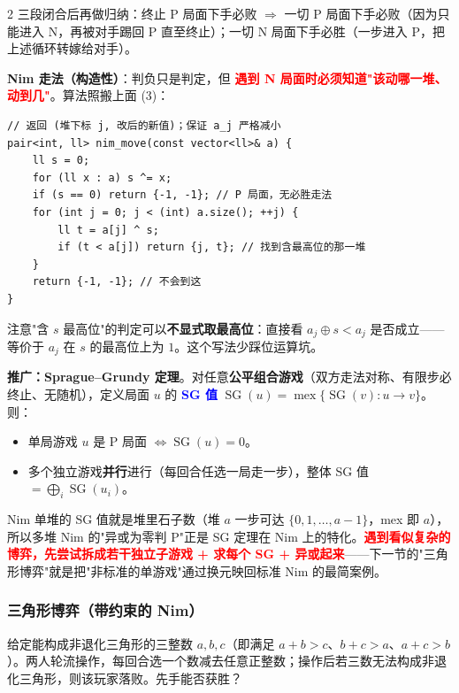 \begin{multicols*}{2}
		三段闭合后再做归纳：终止 P 局面下手必败 $\Rightarrow$ 一切 P 局面下手必败（因为只能进入 N，再被对手踢回 P 直至终止）；一切 N 局面下手必胜（一步进入 P，把上述循环转嫁给对手）。

		\textbf{Nim 走法（构造性）}：判负只是判定，但 \textcolor{red}{\textbf{遇到 N 局面时必须知道"该动哪一堆、动到几"}}。算法照搬上面 (3)：

		\begin{verbatim}
// 返回 (堆下标 j, 改后的新值)；保证 a_j 严格减小
pair<int, ll> nim_move(const vector<ll>& a) {
    ll s = 0;
    for (ll x : a) s ^= x;
    if (s == 0) return {-1, -1}; // P 局面，无必胜走法
    for (int j = 0; j < (int) a.size(); ++j) {
        ll t = a[j] ^ s;
        if (t < a[j]) return {j, t}; // 找到含最高位的那一堆
    }
    return {-1, -1}; // 不会到这
}
		\end{verbatim}

		注意"含 $s$ 最高位"的判定可以\textbf{不显式取最高位}：直接看 $a_j \oplus s < a_j$ 是否成立——等价于 $a_j$ 在 $s$ 的最高位上为 $1$。这个写法少踩位运算坑。

		\textbf{推广：Sprague–Grundy 定理}。对任意\textbf{公平组合游戏}（双方走法对称、有限步必终止、无随机），定义局面 $u$ 的 \textcolor{blue}{\textbf{SG 值}} $\operatorname{SG}(u) = \operatorname{mex}\{\operatorname{SG}(v) : u \to v\}$。则：

		\begin{itemize}
			\item 单局游戏 $u$ 是 P 局面 $\iff \operatorname{SG}(u) = 0$。
			\item 多个独立游戏\textbf{并行}进行（每回合任选一局走一步），整体 SG 值 $= \bigoplus_i \operatorname{SG}(u_i)$。
		\end{itemize}

		Nim 单堆的 SG 值就是堆里石子数（堆 $a$ 一步可达 $\{0, 1, \dots, a-1\}$，mex 即 $a$），所以多堆 Nim 的"异或为零判 P"正是 SG 定理在 Nim 上的特化。\textcolor{red}{\textbf{遇到看似复杂的博弈，先尝试拆成若干独立子游戏 + 求每个 SG + 异或起来}}——下一节的"三角形博弈"就是把"非标准的单游戏"通过换元映回标准 Nim 的最简案例。

		\subsubsection{三角形博弈（带约束的 Nim）}

		给定能构成非退化三角形的三整数 $a, b, c$（即满足 $a+b>c$、$b+c>a$、$a+c>b$）。两人轮流操作，每回合选一个数减去任意正整数；操作后若三数无法构成非退化三角形，则该玩家落败。先手能否获胜？


\end{multicols*}
